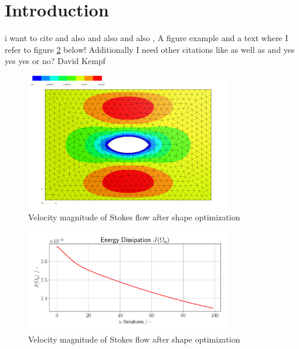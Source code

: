 \section{Introduction}

i want to cite \cite{fully_semi_paper_sturm}
and also \cite{vol_bary_constraint_paper} and also \cite{lecture_notes_sturm} and also \cite{nearly_conformal_paper}, 
A figure example and a text where I refer to figure \ref{shape_opt_plot} below! Additionally I need other citations like \cite{lecture_notes_faustmann_numPDE}
as well as \cite{lecture_notes_faustmann_AMF} and \cite{lecture_notes_melenk_numcomp}
yes yes yes or no? David Kempf
\begin{figure}[ht]
    \centering
    \includegraphics[width=0.8\textwidth]{figures/solution_shape_opt.PNG}
	\caption{Velocity magnitude of Stokes flow after shape optimization}
	\label{shape_opt_plot}
\end{figure}

\begin{figure}[ht]
    \centering
    \includegraphics[width=0.8\textwidth]{figures/energy_diss_plot.pdf}
	\caption{Velocity magnitude of Stokes flow after shape optimization}
	\label{shape_opt_plot}
\end{figure}